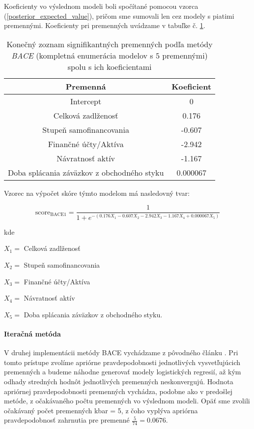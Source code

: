Koeficienty vo výslednom modeli boli spočítané pomocou vzorca (\ref{posterior_expected_value}), pričom sme sumovali len cez modely s piatimi premennými.
Koeficienty pri premenných uvádzame v tabuľke č. \ref{bace1 tabulka konecne parametre}.

\begin{table}
    \begin{tabular}{ |c|c| }
        \hline
        Premenná & Koeficient \\
        \hline
        Intercept & 0 \\
        \hline
        Celková zadlženosť & 0.176 \\
        \hline
        Stupeň samofinancovania & -0.607 \\
        \hline
        Finančné účty/Aktíva & -2.942 \\
        \hline
        Návratnosť aktív & -1.167 \\
        \hline
        Doba splácania záväzkov z obchodného styku & 0.000067 \\
        \hline
    \end{tabular}
    \caption{Konečný zoznam signifikantných premenných podľa metódy \emph{BACE} (kompletná enumerácia modelov s \(5\) premennými) spolu s ich koeficientami}
    \label{bace1 tabulka konecne parametre}
\end{table}

Vzorec na výpočet skóre týmto modelom má nasledovný tvar:

\[
    \text{score}_\text{BACE1} = \frac{1}{1 + e^{-(0.176X_1 - 0.607X_2 - 2.942X_3 - 1.167X_4 + 0.000067X_5)}}
\]

kde

\(X_1 = \) Celková zadlženosť

\(X_2 = \) Stupeň samofinancovania

\(X_3 = \) Finančné účty/Aktíva

\(X_4 = \) Návratnosť aktív

\(X_5 = \) Doba splácania záväzkov z obchodného styku.

\paragraph{Iteračná metóda}

V druhej implementácii metódy BACE vychádzame z pôvodného článku \cite{sala-i-martin}.
Pri tomto prístupe zvolíme apriórne pravdepodobnosti jednotlivých vysvetľujúcich premenných a budeme náhodne generovať modely logistických regresií,
až kým odhady stredných hodnôt jednotlivých premenných neskonvergujú.
Hodnota apriórnej pravdepodobnosti premenných vychádza, podobne ako v predošlej metóde, z očakávaného počtu premenných vo výslednom modeli.
Opäť sme zvolili očakávaný počet premenných kbar = 5, z čoho vyplýva apriórna pravdepodobnosť zahrnutia pre premenné \( \frac{5}{74} = 0.0676 \).

